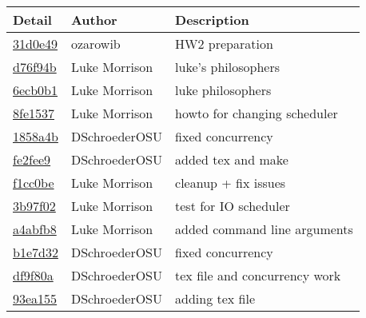 \documentclass[10pt,letterpaper,draftclsnofoot,onecolumn]{IEEEtran}
\begin{document}
\noindent\begin{tabular}{l l l}\textbf{Detail} & \textbf{Author} & \textbf{Description}\\\hline
\href{https://github.com/DSchroederOSU/CS444-Group\_11\_05/commit/31d0e499089bc16ec0f1a8651c6579b882fe3837}{31d0e49} & ozarowib & HW2 preparation\\\hline
\href{https://github.com/DSchroederOSU/CS444-Group\_11\_05/commit/d76f94b4ef4e153d4a4082e754008b003cbcb8fc}{d76f94b} & Luke Morrison & luke's philosophers\\\hline
\href{https://github.com/DSchroederOSU/CS444-Group\_11\_05/commit/6ecb0b1be6e85c16b4d50d2c492c10fb3598a1d2}{6ecb0b1} & Luke Morrison & luke philosophers\\\hline
\href{https://github.com/DSchroederOSU/CS444-Group\_11\_05/commit/8fe1537eedfae5e846f6cb43d280fc8f716fc7d0}{8fe1537} & Luke Morrison & howto for changing scheduler\\\hline
\href{https://github.com/DSchroederOSU/CS444-Group\_11\_05/commit/1858a4b72e56d55cf51047d145d37da8924d0a95}{1858a4b} & DSchroederOSU & fixed concurrency\\\hline
\href{https://github.com/DSchroederOSU/CS444-Group\_11\_05/commit/fe2fee9cb7be6a8dc4f24a05b72d855ab6f14d2e}{fe2fee9} & DSchroederOSU & added tex and make\\\hline
\href{https://github.com/DSchroederOSU/CS444-Group\_11\_05/commit/f1cc0bee6c166599c52da86c7462076456200697}{f1cc0be} & Luke Morrison & cleanup + fix issues\\\hline
\href{https://github.com/DSchroederOSU/CS444-Group\_11\_05/commit/3b97f026eb869e0905fb8d1b09213294b9f629d6}{3b97f02} & Luke Morrison & test for IO scheduler\\\hline
\href{https://github.com/DSchroederOSU/CS444-Group\_11\_05/commit/a4abfb8d116f312257ec679de7d846a52eec9281}{a4abfb8} & Luke Morrison & added command line arguments\\\hline
\href{https://github.com/DSchroederOSU/CS444-Group\_11\_05/commit/b1e7d32a4b99257f3570ea84c4e2a08c60eb89e1}{b1e7d32} & DSchroederOSU & fixed concurrency\\\hline
\href{https://github.com/DSchroederOSU/CS444-Group\_11\_05/commit/df9f80af0d69e84ff3f2b052b8af192c2340c0d5}{df9f80a} & DSchroederOSU & tex file and concurrency work\\\hline
\href{https://github.com/DSchroederOSU/CS444-Group\_11\_05/commit/93ea155de2ddeeb5360af8ec1df1ad7b1b315a10}{93ea155} & DSchroederOSU & adding tex file\\\hline

\end{tabular}
\end{document}
